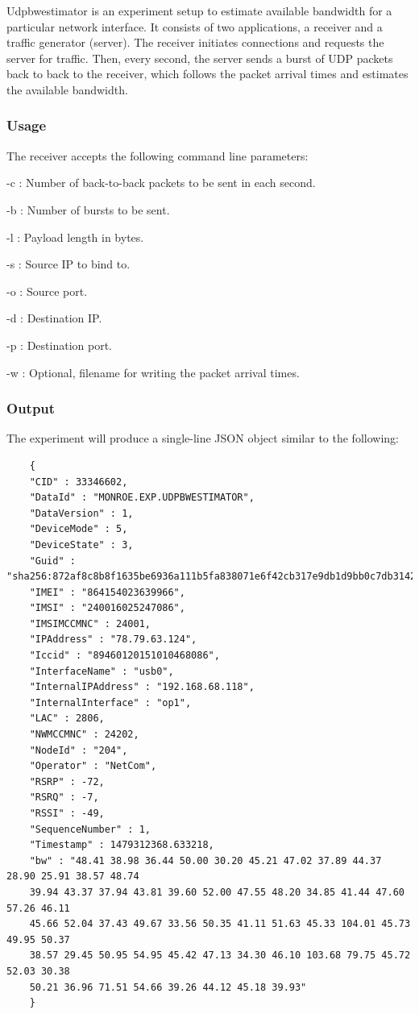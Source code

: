 \documentclass[a4paper,10pt]{article}
\newcommand{\VerbatimFont}{\footnotesize}
\begin{document}
Udpbwestimator is an experiment setup to estimate available bandwidth for a particular network interface.
It consists of two applications, a receiver and a traffic generator (server).
The receiver initiates connections and requests the server for traffic.
Then, every second, the server sends a burst of UDP packets back to back to the receiver, which follows the packet arrival times and estimates the available bandwidth.

\subsubsection{Usage}

The receiver accepts the following command line parameters:
\begin{itemize*}
	\item[] -c : Number of back-to-back packets to be sent in each second.
	\item[] -b : Number of bursts to be sent.
	\item[] -l : Payload length in bytes.
	\item[] -s : Source IP to bind to.
	\item[] -o : Source port.
	\item[] -d : Destination IP.
	\item[] -p : Destination port.
	\item[] -w : Optional, filename for writing the packet arrival times.
\end{itemize*}

\subsubsection{Output}

The experiment will produce a single-line JSON object similar to the following:

{\VerbatimFont
	\begin{verbatim}
	{
	"CID" : 33346602,
	"DataId" : "MONROE.EXP.UDPBWESTIMATOR",
	"DataVersion" : 1,
	"DeviceMode" : 5,
	"DeviceState" : 3,
	"Guid" : "sha256:872af8c8b8f1635be6936a111b5fa838071e6f42cb317e9db1d9bb0c7db31425.93321.204.1",
	"IMEI" : "864154023639966",
	"IMSI" : "240016025247086",
	"IMSIMCCMNC" : 24001,
	"IPAddress" : "78.79.63.124",
	"Iccid" : "89460120151010468086",
	"InterfaceName" : "usb0",
	"InternalIPAddress" : "192.168.68.118",
	"InternalInterface" : "op1",
	"LAC" : 2806,
	"NWMCCMNC" : 24202,
	"NodeId" : "204",
	"Operator" : "NetCom",
	"RSRP" : -72,
	"RSRQ" : -7,
	"RSSI" : -49,
	"SequenceNumber" : 1,
	"Timestamp" : 1479312368.633218,
	"bw" : "48.41 38.98 36.44 50.00 30.20 45.21 47.02 37.89 44.37 28.90 25.91 38.57 48.74 
	39.94 43.37 37.94 43.81 39.60 52.00 47.55 48.20 34.85 41.44 47.60 57.26 46.11 
	45.66 52.04 37.43 49.67 33.56 50.35 41.11 51.63 45.33 104.01 45.73 49.95 50.37 
	38.57 29.45 50.95 54.95 45.42 47.13 34.30 46.10 103.68 79.75 45.72 52.03 30.38 
	50.21 36.96 71.51 54.66 39.26 44.12 45.18 39.93"
	}
	\end{verbatim}}
\end{document}
